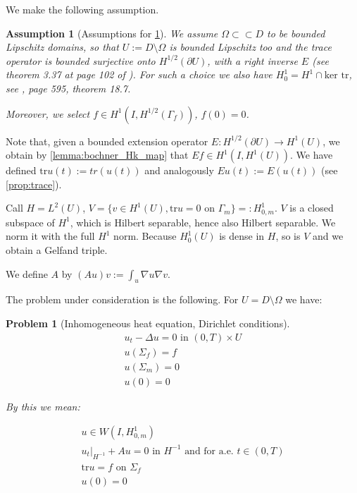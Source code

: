 \documentclass[english,a4paper,9pt,oneside]{scrbook}	%
\theoremstyle{break}
\newtheorem{ass}[equation]{Assumption}
\newtheorem{pb}[equation]{Problem}
\theoremstyle{remark}
\newcommand{\tr}{\text{tr}}
\newcommand{\cc}{\subset\subset}
\begin{document}
\begin{appendices}
We make the following assumption.

\begin{ass}[Assumptions for \cref{pb:diri}]
\label{ass:diri}
We assume $\Omega \cc D $ to be bounded Lipschitz domains, so that $U:=D\setminus \Omega$ is bounded Lipschitz too and  the trace operator is bounded surjective onto $H^{1/2}(\partial U)$, with a right inverse $E$ (see theorem 3.37 at page 102 of \cite{mclean}). For such a choice we also have $H^1_0=H^1\cap \text{ker }\tr$, see \cite{leoni}, page 595, theorem 18.7.

Moreover, we select $f \in H^1(I, H^{1/2}(\Gamma_f))$, $f(0)=0$.
\end{ass}

Note that, given a bounded extension operator $E: H^{1/2}(\partial U) \rightarrow H^1(U)$, we obtain by \cref{lemma:bochner_Hk_map} that $Ef \in H^1(I, H^1(U))$. We have defined $\tr u (t):= tr(u(t))$ and analogously $Eu(t):=E(u(t))$ (see \cref{prop:trace}).

Call $H=L^2(U)$, $V=\{ v \in H^1(U), \tr u = 0 \text{ on } \Gamma_m\}=:H^1_{0,m}$. $V$ is a closed subspace of $H^1$, which is Hilbert separable, hence also Hilbert separable. We norm it with the full $H^1$ norm. Because $H^1_0(U)$ is dense in $H$, so is $V$ and we obtain a Gelfand triple. 


We define $A$ by $(Au)v:=\int_u\nabla u \nabla v$.

The problem under consideration is the following. For $U = D\setminus \Omega$ we have:

\begin{pb}[Inhomogeneous heat equation, Dirichlet conditions]
\label{pb:diri}
\begin{align}
u_t - \Delta u = 0 \text{ in } (0,T)\times U\\
u(\Sigma_f)=f\\
u(\Sigma_m)=0\\
u(0)=0
\end{align}

By this we mean:

\begin{align}
u \in W(I,H^1_{0,m}) \\
u_t|_{H^{-1}} + A u = 0 \text{ in }H^{-1} \text{ and for a.e. } t \in (0,T) \\
\tr u = f \text{ on } \Sigma_f\\
u(0)=0
\end{align}


\end{pb}
\end{appendices}
\end{document}
